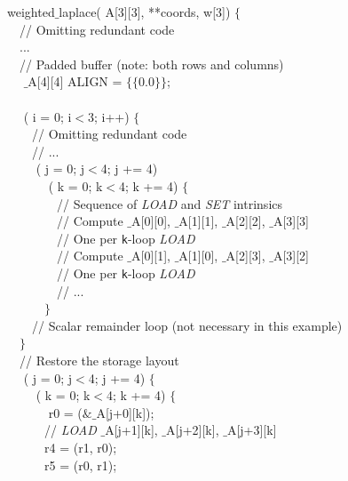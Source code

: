 \begin{algorithm}
\scriptsize\ttfamily
{}

 weighted$\_$laplace( A[3][3],  **coords,  w[3]) $\lbrace$\\
~~// Omitting redundant code \\
~~...\\
~~// Padded buffer (note: both rows and columns) \\
~~ $\_$A[4][4] ALIGN = $\lbrace\lbrace$0.0$\rbrace\rbrace$;\\
~~\\
~~ ( i = 0; i$<$3; i++) $\lbrace$ \\
~~~~// Omitting redundant code \\
~~~~// ... \\
~~~~ ( j = 0; j$<$4; j += 4) \\
~~~~~~ ( k = 0; k$<$4; k += 4) $\lbrace$\\
~~~~~~~~// Sequence of \emph{LOAD} and \emph{SET} intrinsics \\
~~~~~~~~// Compute $\_$A[0][0], $\_$A[1][1], $\_$A[2][2], $\_$A[3][3] \\
~~~~~~~~// One  per \texttt{k}-loop \emph{LOAD}\\
~~~~~~~~// Compute $\_$A[0][1], $\_$A[1][0], $\_$A[2][3], $\_$A[3][2] \\
~~~~~~~~// One  per \texttt{k}-loop \emph{LOAD}\\
~~~~~~~~// ...\\
~~~~~~$\rbrace$\\
~~~~// Scalar remainder loop (not necessary in this example)\\
~~$\rbrace$\\
~~// Restore the storage layout\\
~~ ( j = 0; j$<$4; j += 4) $\lbrace$\\
~~~~ ( k = 0; k$<$4; k += 4) $\lbrace$\\
~~~~~~ r0 =  ($\&\_$A[j+0][k]);\\
~~~~~~// \emph{LOAD} $\_$A[j+1][k], $\_$A[j+2][k], $\_$A[j+3][k]\\
~~~~~~r4 =  (r1, r0);\\
~~~~~~r5 =  (r0, r1);\\

\end{algorithm}
